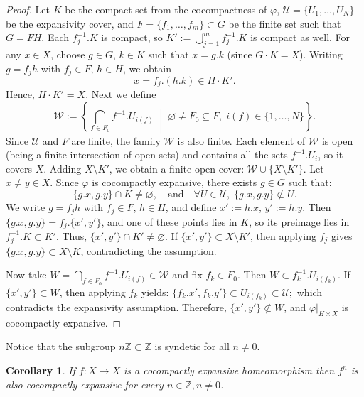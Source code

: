 \documentclass[12pt]{amsart}
\newcommand{\Z}{\mathbb Z}
\theoremstyle{plain}
\newtheorem{corollary}[theorem]{Corollary}
\theoremstyle{definition}
\theoremstyle{remark}
\begin{document}
\begin{proof}
Let \( K \) be the compact set from the cocompactness of \( \varphi \), \( \mathcal{U} = \{ U_1, \ldots, U_N \} \) be the expansivity cover, and \( F = \{ f_1, \ldots, f_m \} \subset G \) be the finite set such that \( G = F H \).
Each \( f_j^{-1}.K \) is compact, so \( K' := \bigcup_{j=1}^m f_j^{-1}.K \) is compact as well.
For any \( x \in X \), choose \( g \in G \), \( k \in K \) such that \( x = g.k \) (since \( G \cdot K = X \)).
Writing \( g = f_j h \) with \( f_j \in F \), \( h \in H \), we obtain
\[
x = f_j.(h.k) \in H \cdot K'.
\]
Hence, \( H \cdot K' = X \).
Next we define
\[
\mathcal{W}
:= \left\{
  \bigcap_{f \in F_0} f^{-1}.U_{i(f)} \;\middle|\;
  \varnothing \ne F_0 \subseteq F,\;
  i(f) \in \{1, \ldots, N\}
\right\}.
\]
Since \( \mathcal{U} \) and \( F \) are finite, the family \( \mathcal{W} \) is also finite.
Each element of \( \mathcal{W} \) is open (being a finite intersection of open sets) and contains all the sets \( f^{-1}.U_i \), so it covers \( X \).
Adding \( X \setminus K' \), we obtain a finite open cover:
$
\mathcal{W} \cup \{ X \setminus K' \}.
$
Let \( x \ne y \in X \). Since \( \varphi \) is cocompactly expansive, there exists \( g \in G \) such that:
\[
\{ g.x, g.y \} \cap K \ne \varnothing,
\quad \text{and} \quad
\forall U \in \mathcal{U},\;
\{ g.x, g.y \} \not\subset U.
\]
We write \( g = f_j h \) with \( f_j \in F \), \( h \in H \), and define \( x' := h.x \), \( y' := h.y \).
Then \( \{ g.x, g.y \} = f_j.\{ x', y' \} \), and one of these points lies in \( K \), so its preimage lies in \( f_j^{-1}.K \subset K' \).
Thus,
$
\{ x', y' \} \cap K' \ne \varnothing.
$
If \( \{ x', y' \} \subset X \setminus K' \), then applying \( f_j \) gives
\( \{ g.x, g.y \} \subset X \setminus K \), contradicting the assumption.

Now take \( W = \bigcap_{f \in F_0} f^{-1}.U_{i(f)} \in \mathcal{W} \) and fix \( f_k \in F_0 \). Then \( W \subset f_k^{-1}.U_{i(f_k)} \).
If \( \{ x', y' \} \subset W \), then applying \( f_k \) yields:
$
\{ f_k.x', f_k.y' \} \subset U_{i(f_k)} \subset \mathcal{U};
$
which contradicts the expansivity assumption.
Therefore, \( \{ x', y' \} \not\subset W \), and \( \varphi|_{H \times X} \) is cocompactly expansive.
\end{proof}

Notice that the subgroup \( n\mathbb{Z} \subset\Z \) is syndetic for all $n\neq 0$.

\begin{corollary}
\label{coroCocoExpPotencia}
 If \( f : X \to X \) is a cocompactly expansive homeomorphism then \( f^n \) is also cocompactly expansive for every \( n \in \mathbb{Z}, n\neq 0 \).
\end{corollary}
\end{document}
